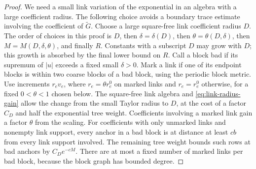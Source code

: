 \documentclass[11pt]{article}
\begin{document}
\begin{proof}
We need a small link variation of the exponential in an algebra
with a large coefficient radius. The following choice avoids a
boundary trace estimate involving the coefficient of
\(\widetilde G\). Choose a large square-free link coefficient
radius \(D\). The order of choices in this proof is
\(D\), then \(\delta=\delta(D)\), then
\(\theta=\theta(D,\delta)\), then
\(M=M(D,\delta,\theta)\), and finally \(R\).
Constants with a subscript \(D\) may grow with \(D\); this growth
is absorbed by the final lower bound on \(R\). Call a block bad if its supremum of \(|u|\) exceeds
a fixed small \(\delta>0\). Mark a link if one of its endpoint
blocks is within two coarse blocks of a bad block, using the
periodic block metric. Use increments \(r_e v_e\), where
\(r_e=\theta r_e^0\) on marked links and \(r_e=r_e^0\) otherwise,
for a fixed \(0<\theta<1\) chosen below. The square-free link algebra and \eqref{eq:link-radius-gain}
allow the change from the small Taylor radius to \(D\), at the
cost of a factor \(C_D\) and half the exponential tree weight. Coefficients involving a marked link gain a factor
\(\theta\) from the scaling. For coefficients with only unmarked
links and nonempty link support, every anchor in a bad block is
at distance at least \(cb\) from every link support involved.
The remaining tree weight bounds such rows at bad anchors by
\(C_D e^{-cM}\). There are at most a fixed number of marked
links per bad block, because the block graph has bounded degree.


\end{proof}
\end{document}
